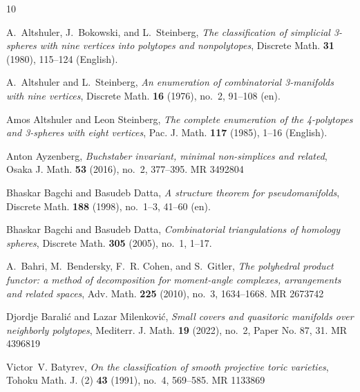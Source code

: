 \documentclass[11pt]{amsart}
\theoremstyle{plain}
\numberwithin{equation}{section}
\theoremstyle{definition}
\begin{document}

\providecommand{\bysame}{\leavevmode\hbox to3em{\hrulefill}\thinspace}
\providecommand{\MR}{\relax\ifhmode\unskip\space\fi MR }
\providecommand{\MRhref}[2]{%
	\href{http://www.ams.org/mathscinet-getitem?mr=#1}{#2}
}
\providecommand{\href}[2]{#2}
\begin{thebibliography}{10}
	
	A.~Altshuler, J.~Bokowski, and L.~Steinberg, \emph{The classification of
		simplicial 3-spheres with nine vertices into polytopes and nonpolytopes},
	Discrete Math. \textbf{31} (1980), 115–124 (English).
	
	A.~Altshuler and L.~Steinberg, \emph{An enumeration of combinatorial
		3-manifolds with nine vertices}, Discrete Math. \textbf{16} (1976), no.~2,
	91–108 (en).
	
	Amos Altshuler and Leon Steinberg, \emph{The complete enumeration of the
		4-polytopes and 3-spheres with eight vertices}, Pac. J. Math. \textbf{117}
	(1985), 1--16 (English).
	
	Anton Ayzenberg, \emph{Buchstaber invariant, minimal non-simplices and
		related}, Osaka J. Math. \textbf{53} (2016), no.~2, 377--395. \MR{3492804}
	
	Bhaskar Bagchi and Basudeb Datta, \emph{A structure theorem for
		pseudomanifolds}, Discrete Math. \textbf{188} (1998), no.~1–3, 41–60
	(en).
	
	Bhaskar Bagchi and Basudeb Datta, \emph{Combinatorial triangulations of
		homology spheres}, Discrete Math. \textbf{305} (2005), no.~1, 1--17.
	
	A.~Bahri, M.~Bendersky, F.~R. Cohen, and S.~Gitler, \emph{The polyhedral
		product functor: a method of decomposition for moment-angle complexes,
		arrangements and related spaces}, Adv. Math. \textbf{225} (2010), no.~3,
	1634--1668. \MR{2673742}
	
	Djordje Barali\'{c} and Lazar Milenkovi\'{c}, \emph{Small covers and quasitoric
		manifolds over neighborly polytopes}, Mediterr. J. Math. \textbf{19} (2022),
	no.~2, Paper No. 87, 31. \MR{4396819}
	
	Victor~V. Batyrev, \emph{On the classification of smooth projective toric
		varieties}, Tohoku Math. J. (2) \textbf{43} (1991), no.~4, 569--585.
	\MR{1133869}
	

\end{thebibliography}
\end{document}
